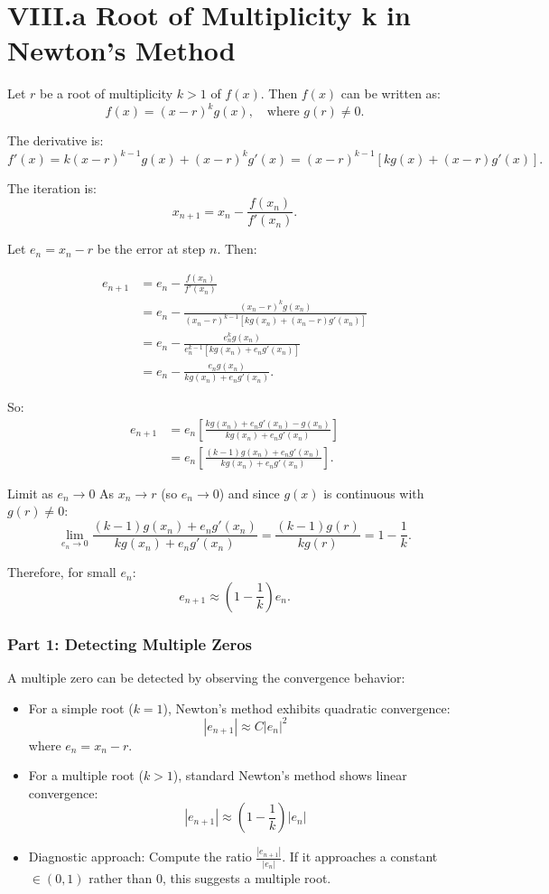 \documentclass[a4paper]{article}
\begin{document}
\section*{VIII.a Root of Multiplicity k in Newton's Method}

Let \( r \) be a root of multiplicity \( k > 1 \) of \( f(x) \). Then \( f(x) \) can be written as:
\[
f(x) = (x - r)^k g(x), \quad \text{where }  g(r) \neq 0.
\]

The derivative is:
\[
f'(x) = k(x - r)^{k-1} g(x) + (x - r)^k g'(x) = (x - r)^{k-1} [k g(x) + (x - r) g'(x)].
\]

The iteration is:
\[
x_{n+1} = x_n - \frac{f(x_n)}{f'(x_n)}.
\]

Let \( e_n = x_n - r \) be the error at step \( n \). Then:

\[
\begin{aligned}
e_{n+1} &= e_n - \frac{f(x_n)}{f'(x_n)} \\
&= e_n - \frac{(x_n - r)^k g(x_n)}{(x_n - r)^{k-1} [k g(x_n) + (x_n - r) g'(x_n)]} \\
&= e_n - \frac{e_n^k g(x_n)}{e_n^{k-1} [k g(x_n) + e_n g'(x_n)]} \\
&= e_n - \frac{e_n g(x_n)}{k g(x_n) + e_n g'(x_n)}.
\end{aligned}
\]

So:
\[
\begin{aligned}
e_{n+1} &= e_n \left[ \frac{k g(x_n) + e_n g'(x_n) - g(x_n)}{k g(x_n) + e_n g'(x_n)} \right] \\
&= e_n \left[ \frac{(k-1) g(x_n) + e_n g'(x_n)}{k g(x_n) + e_n g'(x_n)} \right].
\end{aligned}
\]

Limit as \( e_n \to 0 \)
As \( x_n \to r \) (so \( e_n \to 0 \)) and since \( g(x) \) is continuous with \( g(r) \neq 0 \):
\[
\lim_{e_n \to 0} \frac{(k-1) g(x_n) + e_n g'(x_n)}{k g(x_n) + e_n g'(x_n)} = \frac{(k-1) g(r)}{k g(r)} = 1 - \frac{1}{k}.
\]

Therefore, for small \( e_n \):
\[
e_{n+1} \approx \left(1 - \frac{1}{k}\right) e_n.
\]

\subsubsection*{Part 1: Detecting Multiple Zeros}

A multiple zero can be detected by observing the convergence behavior:

\begin{itemize}
\item For a simple root (\( k = 1 \)), Newton's method exhibits quadratic convergence:
\[
|e_{n+1}| \approx C |e_n|^2
\]
where \( e_n = x_n - r \).

\item For a multiple root (\( k > 1 \)), standard Newton's method shows linear convergence:
\[
|e_{n+1}| \approx \left(1 - \frac{1}{k}\right) |e_n|
\]

\item Diagnostic approach: Compute the ratio \( \frac{|e_{n+1}|}{|e_n|} \). If it approaches a constant \( \in (0, 1) \) rather than 0, this suggests a multiple root.
\end{itemize}
\end{document}
